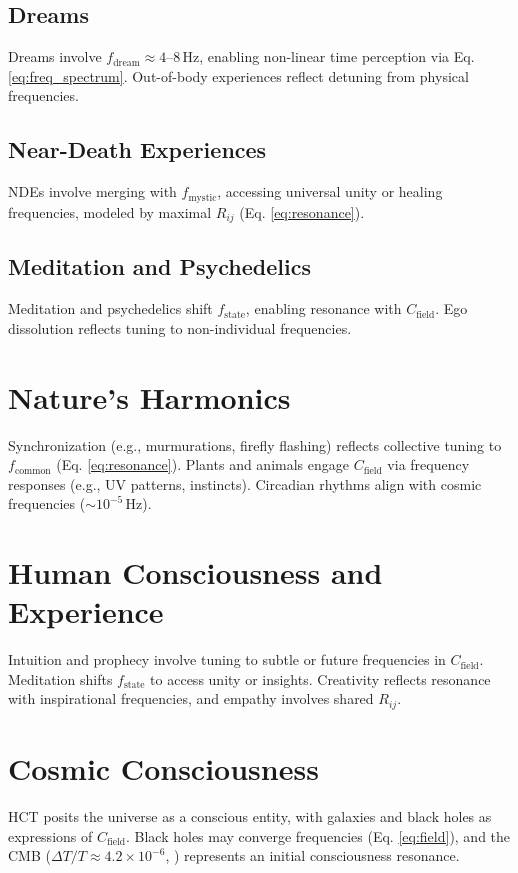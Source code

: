 \documentclass[a4paper,12pt]{article}
\begin{document}
\subsection{Dreams}
Dreams involve $f_{\text{dream}} \approx 4\text{--}8 \, \text{Hz}$, enabling non-linear time perception via Eq. \ref{eq:freq_spectrum}. Out-of-body experiences reflect detuning from physical frequencies.

\subsection{Near-Death Experiences}
NDEs involve merging with $f_{\text{mystic}}$, accessing universal unity or healing frequencies, modeled by maximal $R_{ij}$ (Eq. \ref{eq:resonance}).

\subsection{Meditation and Psychedelics}
Meditation and psychedelics shift $f_{\text{state}}$, enabling resonance with $C_{\text{field}}$. Ego dissolution reflects tuning to non-individual frequencies.

\section{Nature’s Harmonics}
\label{sec:nature}
Synchronization (e.g., murmurations, firefly flashing) reflects collective tuning to $f_{\text{common}}$ (Eq. \ref{eq:resonance}). Plants and animals engage $C_{\text{field}}$ via frequency responses (e.g., UV patterns, instincts). Circadian rhythms align with cosmic frequencies ($\sim 10^{-5} \, \text{Hz}$).

\section{Human Consciousness and Experience}
\label{sec:human_exp}
Intuition and prophecy involve tuning to subtle or future frequencies in $C_{\text{field}}$. Meditation shifts $f_{\text{state}}$ to access unity or insights. Creativity reflects resonance with inspirational frequencies, and empathy involves shared $R_{ij}$.

\section{Cosmic Consciousness}
\label{sec:cosmic}
HCT posits the universe as a conscious entity, with galaxies and black holes as expressions of $C_{\text{field}}$. Black holes may converge frequencies (Eq. \ref{eq:field}), and the CMB ($\Delta T / T \approx 4.2 \times 10^{-6}$, \cite{Planck2018}) represents an initial consciousness resonance.
\end{document}
